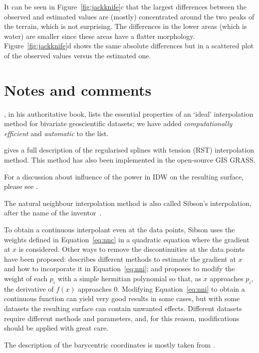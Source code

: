 It can be seen in Figure~\ref{fig:jackknife}c that the largest differences between the observed and estimated values are (mostly) concentrated around the two peaks of the terrain, which is not surprising.
The differences in the lower areas (which is water) are smaller since these areas have a flatter morphology.
Figure~\ref{fig:jackknife}d shows the same absolute differences but in a scattered plot of the observed values versus the estimated one.



%
\section{Notes and comments}


\citet{Watson92}, in his authoritative book, lists the essential properties of an `ideal' interpolation method for bivariate geoscientific datasets; we have added \emph{computationally efficient} and \emph{automatic} to the list.

\citet{Mitasova93} gives a full description of the regularised splines with tension (RST) interpolation method.
This method has also been implemented in the open-source GIS GRASS\@.

For a discussion about influence of the power in IDW on the resulting surface, please see \citet{Watson92}.

The natural neighbour interpolation method is also called Sibson's interpolation, after the name of the inventor~\citep{Sibson81}. 

To obtain a continuous interpolant even at the data points, Sibson uses the weights defined in Equation~\ref{eq:nnc} in a quadratic equation where the gradient at $x$ is considered. 
Other ways to remove the discontinuities at the data points have been proposed: \citet{Watson92} describes different methods to estimate the gradient at $x$ and how to incorporate it in Equation~\ref{eq:nni}; and \citet{Gold89} proposes to modify the weight of each $p_{i}$ with a simple hermitian polynomial so that, as $x$ approaches $p_{i}$, the derivative of $f(x)$ approaches 0. 
Modifying Equation~\ref{eq:nni} to obtain a continuous function can yield very good results in some cases, but with some datasets the resulting surface can contain unwanted effects.
Different datasets require different methods and parameters, and, for this reason, modifications should be applied with great care. 

The description of the barycentric coordinates is mostly taken from \citet{Eberly18}.

